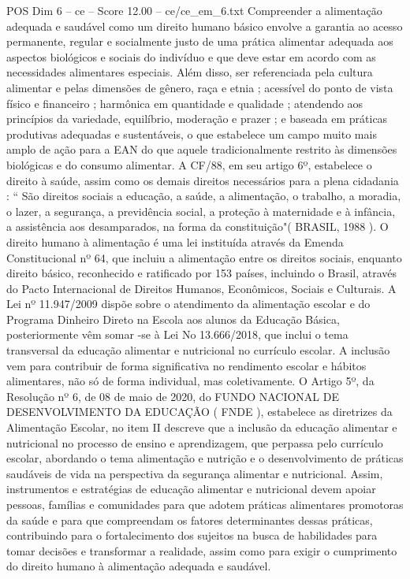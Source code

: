 \begin{textsample}{POS Dim 6 – ce – Score 12.00 – ce/ce\_em\_6.txt}
Compreender a alimentação adequada e saudável como um direito humano básico envolve a garantia ao acesso permanente, regular e socialmente justo de uma prática alimentar adequada aos aspectos biológicos e sociais do indivíduo e que deve estar em acordo com as necessidades alimentares especiais.
Além disso, ser referenciada pela cultura alimentar e pelas dimensões de gênero, raça e etnia ; acessível do ponto de vista físico e financeiro ; harmônica em quantidade e qualidade ; atendendo aos princípios da variedade, equilíbrio, moderação e prazer ; e baseada em práticas produtivas adequadas e sustentáveis, o que estabelece um campo muito mais amplo de ação para a EAN do que aquele tradicionalmente restrito às dimensões biológicas e do consumo alimentar.
A CF/88, em seu artigo 6º, estabelece o direito à saúde, assim como os demais direitos necessários para a plena cidadania : “ São direitos sociais a educação, a saúde, a alimentação, o trabalho, a moradia, o lazer, a segurança, a previdência social, a proteção à maternidade e à infância, a assistência aos desamparados, na forma da constituição"( BRASIL, 1988 ).
O direito humano à alimentação é uma lei instituída através da Emenda Constitucional nº 64, que incluiu a alimentação entre os direitos sociais, enquanto direito básico, reconhecido e ratificado por 153 países, incluindo o Brasil, através do Pacto Internacional de Direitos Humanos, Econômicos, Sociais e Culturais.
A Lei nº 11.947/2009 dispõe sobre o atendimento da alimentação escolar e do Programa Dinheiro Direto na Escola aos alunos da Educação Básica, posteriormente vêm somar -se à Lei No 13.666/2018, que inclui o tema transversal da educação alimentar e nutricional no currículo escolar.
A inclusão vem para contribuir de forma significativa no rendimento escolar e hábitos alimentares, não só de forma individual, mas coletivamente.
O Artigo 5º, da Resolução nº 6, de 08 de maio de 2020, do FUNDO NACIONAL DE DESENVOLVIMENTO DA EDUCAÇÃO ( FNDE ), estabelece as diretrizes da Alimentação Escolar, no item II descreve que a inclusão da educação alimentar e nutricional no processo de ensino e aprendizagem, que perpassa pelo currículo escolar, abordando o tema alimentação e nutrição e o desenvolvimento de práticas saudáveis de vida na perspectiva da segurança alimentar e nutricional.
Assim, instrumentos e estratégias de educação alimentar e nutricional devem apoiar pessoas, famílias e comunidades para que adotem práticas alimentares promotoras da saúde e para que compreendam os fatores determinantes dessas práticas, contribuindo para o fortalecimento dos sujeitos na busca de habilidades para tomar decisões e transformar a realidade, assim como para exigir o cumprimento do direito humano à alimentação adequada e saudável.

\end{textsample}
